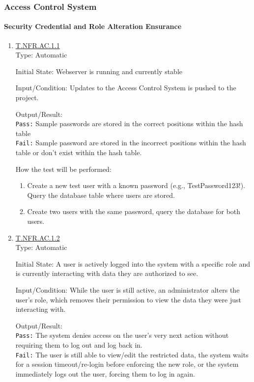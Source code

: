 \documentclass[12pt, titlepage]{article}
\newcommand{\testdef}[1]{\leavevmode\hypertarget{test:#1}{}\hyperlink{trace:#1}{#1}}
\begin{document}
\subsubsection{Access Control System}
\paragraph{Security Credential and Role Alteration Ensurance}
\begin{enumerate}
  \item \testdef{T.NFR.AC.1.1}\\
  Type: Automatic

  Initial State: Webserver is running and currently stable

  Input/Condition: Updates to the Access Control System is pushed to the project.

  Output/Result:\\
  \texttt{Pass:} Sample passwords are stored in the correct positions within the hash table\\
  \texttt{Fail:} Sample password are stored in the incorrect positions within the hash table or don't exist within the hash table.

  How the test will be performed:
  \begin{enumerate}
    \item Create a new test user with a known password (e.g., TestPassword123!). Query the database table where users are stored.
    \item Create two users with the same password, query the database for both users.
  \end{enumerate}


  
  \item \testdef{T.NFR.AC.1.2}\\
  Type: Automatic

  Initial State: A user is actively logged into the system with a specific role and is currently interacting with data they are authorized to see.

  Input/Condition: While the user is still active, an administrator alters the user’s role, which removes their permission to view the data they were just interacting with.

  Output/Result: \\ \texttt{Pass:} The system denies access on the user’s very next action without requiring them to log out and log back in.\\ \texttt{Fail:} The user is still able to view/edit the restricted data, the system waits for a session timeout/re-login before enforcing the new role, or the system immediately logs out the user, forcing them to log in again.


\end{enumerate}
\end{document}
